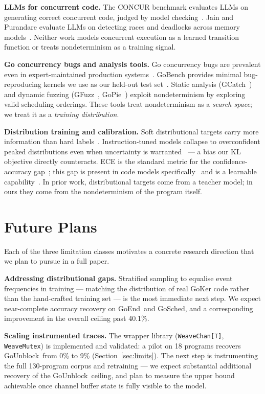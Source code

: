 \documentclass[10pt,conference]{IEEEtran}
\newcommand{\punblock}{\textsf{GoUnblock}}
\newcommand{\pend}{\textsf{GoEnd}}
\newcommand{\psched}{\textsf{GoSched}}
\begin{document}
\textbf{LLMs for concurrent code.}
The CONCUR benchmark evaluates LLMs on generating correct concurrent
code, judged by model checking~\cite{concur}.
Jain and Purandare evaluate LLMs on detecting races and deadlocks across
memory models~\cite{jainpurandare}.
Neither work models concurrent execution as a learned transition
function or treats nondeterminism as a training signal.

\textbf{Go concurrency bugs and analysis tools.}
Go concurrency bugs are prevalent even in expert-maintained production
systems~\cite{goker}.
GoBench provides minimal bug-reproducing kernels we use as our held-out
test set~\cite{gobench}.
Static analysis (GCatch~\cite{gcatch}) and dynamic fuzzing
(GFuzz~\cite{gfuzz}, GoPie~\cite{gopie}) exploit nondeterminism by
exploring valid scheduling orderings.
These tools treat nondeterminism as a \textit{search space}; we treat
it as a \textit{training distribution}.

\textbf{Distribution training and calibration.}
Soft distributional targets carry more information than hard
labels~\cite{hinton}.
Instruction-tuned models collapse to overconfident peaked distributions
even when uncertainty is warranted~\cite{diffuse} — a bias our KL
objective directly counteracts.
ECE is the standard metric for the confidence-accuracy gap~\cite{guocalib};
this gap is present in code models specifically~\cite{spiess} and is a
learnable capability~\cite{probcalib}.
In prior work, distributional targets come from a teacher model; in
ours they come from the nondeterminism of the program itself.

\section{Future Plans}\label{sec:future}

Each of the three limitation classes motivates a concrete research
direction that we plan to pursue in a full paper.

\textbf{Addressing distributional gaps.}
Stratified sampling to equalise event frequencies in training — matching
the distribution of real GoKer code rather than the hand-crafted
training set — is the most immediate next step.
We expect near-complete accuracy recovery on \pend\ and \psched, and
a corresponding improvement in the overall ceiling past 40.1\%.

\textbf{Scaling instrumented traces.}
The wrapper library (\texttt{WeaveChan[T]}, \texttt{WeaveMutex}) is
implemented and validated: a pilot on 18 programs recovers \punblock\
from 0\% to 9\% (Section~\ref{sec:limits}).
The next step is instrumenting the full 130-program corpus and
retraining — we expect substantial additional recovery of the
\punblock\ ceiling, and plan to measure the upper bound achievable
once channel buffer state is fully visible to the model.
\end{document}
